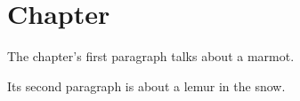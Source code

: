 \section{Chapter}
The chapter's first paragraph talks about a marmot.

Its second paragraph is about a lemur in the snow.
